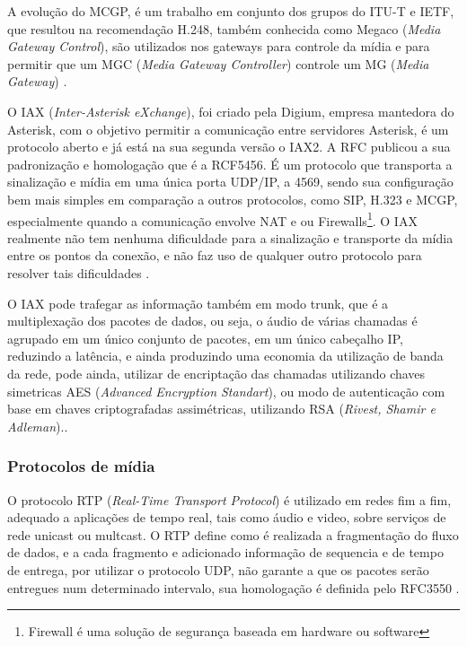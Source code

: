 A evolução do MCGP, é um trabalho em conjunto dos grupos do ITU-T e IETF, que resultou na recomendação H.248, também conhecida como Megaco (\textit{Media Gateway Control}), são utilizados nos gateways para controle da mídia e para permitir que um MGC (\textit{Media Gateway Controller}) controle um MG (\textit{Media Gateway}) \cite{theodorewallingford2005}.

O IAX (\textit{Inter-Asterisk eXchange}), foi criado pela Digium, empresa mantedora do Asterisk, com o objetivo permitir a comunicação entre servidores Asterisk, é um protocolo aberto e já está na sua segunda versão o IAX2. A RFC publicou a sua padronização e homologação que é a RCF5456. É um protocolo que transporta a sinalização e mídia em uma única porta UDP/IP, a 4569, sendo sua configuração bem mais simples em comparação a outros protocolos, como SIP, H.323 e MCGP, especialmente quando a comunicação envolve NAT e ou Firewalls\footnote{Firewall é uma solução de segurança baseada em hardware ou software}. O IAX realmente não tem nenhuma dificuldade para a sinalização e transporte da mídia entre os pontos da conexão, e não faz uso de qualquer outro protocolo para resolver tais dificuldades \cite{alexandrekeller2014}.

O IAX pode trafegar as informação também em modo trunk, que é a multiplexação dos pacotes de dados, ou seja, o áudio de várias chamadas é agrupado em um único conjunto de pacotes, em um único cabeçalho IP, reduzindo a latência, e ainda produzindo uma economia da utilização de banda da rede, pode ainda, utilizar de encriptação das chamadas utilizando chaves simetricas AES (\textit{Advanced Encryption Standart}), ou modo de autenticação com base em chaves criptografadas assimétricas, utilizando RSA (\textit{Rivest, Shamir e Adleman}).\cite{alexandrekeller2014}.

\subsubsection{Protocolos de mídia}

O protocolo RTP (\textit{Real-Time Transport Protocol}) é utilizado em redes fim a fim, adequado a  aplicações de tempo real, tais como áudio e video, sobre serviços de rede unicast ou multcast. O RTP define como é realizada a fragmentação do fluxo de dados, e a cada fragmento e adicionado informação de sequencia e de tempo de entrega, por utilizar o protocolo UDP, não garante a que os pacotes serão entregues num determinado intervalo, sua homologação é definida pelo RFC3550 \cite{henningcasnervan1996}.

